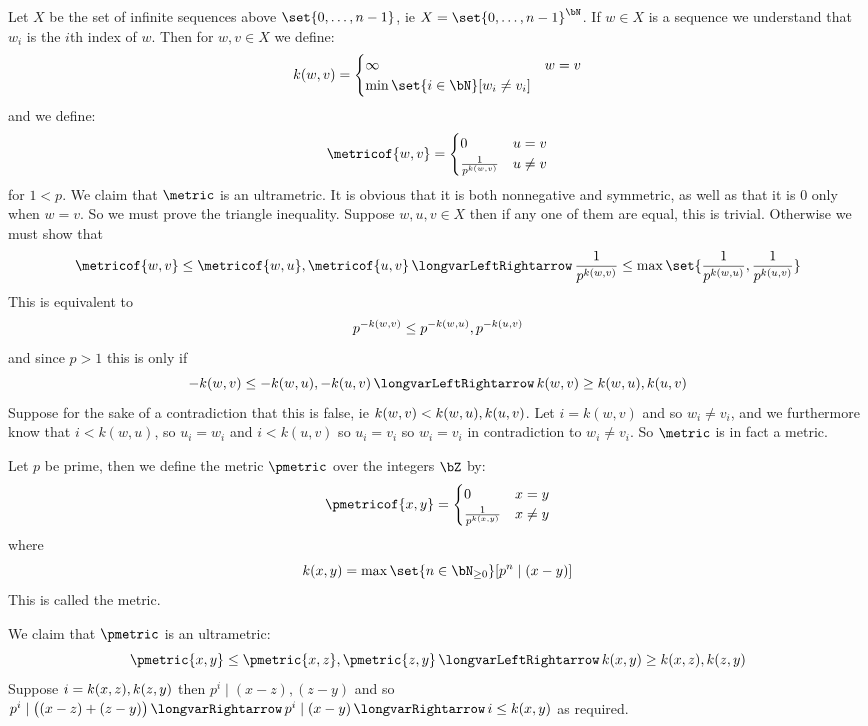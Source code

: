 \documentclass[10pt]{article}
\let\divides=\mid
\def\implies{\,\longvarRightarrow\,}
\def\iff{\,\longvarLeftRightarrow\,}
\begin{document}
Let $X$ be the set of infinite sequences above $\set{0,\dots,n-1}$, ie $X=\set{0,\dots,n-1}^\bN$.
If $w\in X$ is a sequence we understand that $w_i$ is the $i$th index of $w$.
Then for $w,v\in X$ we define:
\[ k(w,v) = \begin{cases} \infty & w=v \\ \min\set{i\in\bN}[w_i\neq v_i] \end{cases} \]
and we define:
\[ \metricof{w,v} = \begin{cases} 0 & u=v \\ \frac1{p^{k(w,v)}} & u\neq v\end{cases} \]
for $1<p$.
We claim that $\metric$ is an ultrametric.
It is obvious that it is both nonnegative and symmetric, as well as that it is $0$ only when $w=v$.
So we must prove the triangle inequality.
Suppose $w,u,v\in X$ then if any one of them are equal, this is trivial.
Otherwise we must show that
\[ \metricof{w,v} \leq \maxof{\metricof{w,u}, \metricof{u,v}} \iff \frac1{p^{k(w,v)}} \leq \max\set{\frac1{p^{k(w,u)}}, \frac1{p^{k(u,v)}}} \]
This is equivalent to
\[ p^{-k(w,v)} \leq \maxof{p^{-k(w,u)}, p^{-k(u,v)}} \]
and since $p>1$ this is only if
\[ -k(w,v) \leq \maxof{-k(w,u), -k(u,v)} \iff k(w,v) \geq \minof{k(w,u), k(u,v)} \]
Suppose for the sake of a contradiction that this is false, ie $k(w,v)<\minof{k(w,u), k(u,v)}$.
Let $i=k(w,v)$ and so $w_i\neq v_i$, and we furthermore know that $i<k(w,u)$, so $u_i=w_i$ and $i<k(u,v)$ so $u_i=v_i$ so $w_i=v_i$ in contradiction to $w_i\neq v_i$.
So $\metric$ is in fact a metric.

\begin{defn*}

    Let $p$ be prime, then we define the metric $\pmetric$ over the integers $\bZ$ by:
    \[ \pmetricof{x,y} = \begin{cases} 0 & x=y \\ \frac1{p^{k(x,y)}} & x\neq y\end{cases} \]
    where
    \[ k(x,y) = \max\set{n\in\bN_{\geq0}}[p^n\divides(x-y)] \]
    This is called the  metric.

\end{defn*}

We claim that $\pmetric$ is an ultrametric:
\[ \pmetric{x,y} \leq \maxof{\pmetric{x,z}, \pmetric{z,y}} \iff k(x,y) \geq \minof{k(x,z), k(z,y)} \]
Suppose $i=\minof{k(x,z), k(z,y)}$ then $p^i\divides (x-z), (z-y)$ and so $p^i\divides\bigl((x-z)+(z-y)\bigr)\implies p^i\divides(x-y)\implies i\leq k(x,y)$ as required.
\end{document}
